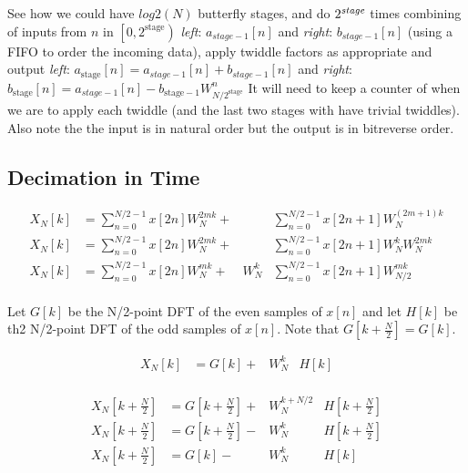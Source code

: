 \documentclass{article}
\begin{document}
See how we could have $log2\left(N\right)$ butterfly stages, and do $2^{\emph{stage}}$ times combining of inputs from $n$ in $\left[0, 2^{\text{stage}}\right)$
\emph{left}: $a_{{stage}-1}[n]$
and \emph{right}: $b_{{stage}-1}[n]$
(using a FIFO to order the incoming data), apply twiddle factors as appropriate and output
\emph{left}: $a_{\text{stage}}[n] = a_{{stage}-1}[n] + b_{{stage}-1}[n] $
and \emph{right}: $b_{\text{stage}}[n] = a_{{stage}-1}[n] - b_{\text{stage}-1} W_{N/2^{\text{stage}}}^{n}$
It will need to keep a counter of when we are to apply each twiddle (and the last two stages with have trivial twiddles).
Also note the the input is in natural order but the output is in bitreverse order.

\pagebreak

\subsection{Decimation in Time}
\begin{align*}
    X_{N}[k] &= \sum_{n=0}^{N/2-1}x[2n] W_{N}^{2mk} + &           &\sum_{n=0}^{N/2-1}x[2n+1] W_{N}^{\left(2m+1\right)k} \\
    X_{N}[k] &= \sum_{n=0}^{N/2-1}x[2n] W_{N}^{2mk} + &           &\sum_{n=0}^{N/2-1}x[2n+1] W_{N}^{k} W_{N}^{2mk} \\
    X_{N}[k] &= \sum_{n=0}^{N/2-1}x[2n] W_{N}^{mk}  + & W_{N}^{k} &\sum_{n=0}^{N/2-1}x[2n+1] W_{N/2}^{mk} \\
\end{align*}

Let $G[k]$ be the N/2-point DFT of the even samples of $x[n]$ and let $H[k]$ be th2 N/2-point DFT of the odd samples of $x[n]$.
Note that $G[k+\frac{N}{2}] = G[k]$.


\begin{minipage}{0.5\textwidth}
  \begin{align*}
    X_{N}[k]               &= G[k]             + & W_{N}^{k}     & H[k] \\
  \end{align*}
\end{minipage}
\begin{minipage}{0.5\textwidth}
  \begin{align*}
    X_{N}[k+\frac{N}{2}]   &= G[k+\frac{N}{2}] + & W_{N}^{k+N/2} & H[k+\frac{N}{2}] \\
    X_{N}[k+\frac{N}{2}]   &= G[k+\frac{N}{2}] - & W_{N}^{k}     & H[k+\frac{N}{2}] \\
    X_{N}[k+\frac{N}{2}]   &= G[k]             - & W_{N}^{k}     & H[k] \\
  \end{align*}
\end{minipage}
\end{document}
